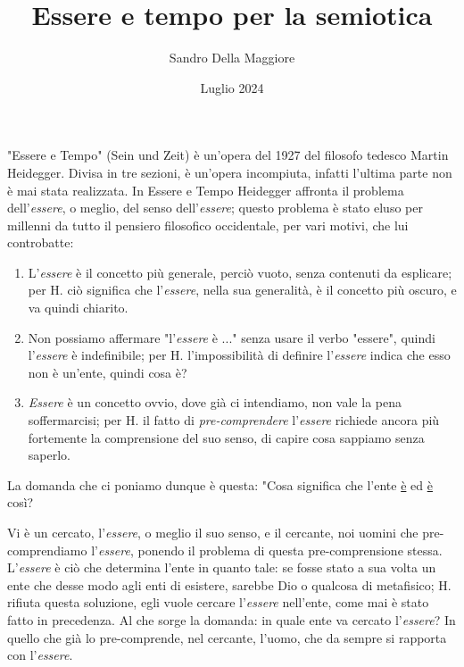 \documentclass[a4paper,12pt,oneside]{article}%
\begin{document}
	\author{Sandro Della Maggiore}
	\title{Essere e tempo per la semiotica}
	\date{Luglio 2024}
	
	\maketitle


"Essere e Tempo" (Sein und Zeit) è un’opera del 1927 del filosofo tedesco Martin Heidegger. Divisa in tre sezioni, è un’opera incompiuta, infatti l’ultima parte non è mai stata realizzata. In Essere e Tempo Heidegger affronta il problema dell’\textit{essere}, o meglio, del senso dell'\textit{essere}; questo problema è stato eluso per millenni da tutto il pensiero filosofico occidentale, per vari motivi, che lui controbatte:

\begin{enumerate}
	\item L'\textit{essere} è il concetto più generale, perciò vuoto, senza contenuti da esplicare; per H. ciò significa che l'\textit{essere}, nella sua generalità, è il concetto più oscuro, e va quindi chiarito.
	\item Non possiamo affermare "l'\textit{essere} è ..." senza usare il verbo "essere", quindi l'\textit{essere} è indefinibile; per H. l'impossibilità di definire l'\textit{essere} indica che esso non è un'ente, quindi cosa è?
	\item \textit{Essere} è un concetto ovvio, dove già ci intendiamo, non vale la pena soffermarcisi; per H. il fatto di \textit{pre-comprendere} l'\textit{essere} richiede ancora più fortemente la comprensione del suo senso, di capire cosa sappiamo senza saperlo.
\end{enumerate}

La domanda che ci poniamo dunque è questa: "Cosa significa che l'ente \underline{è} ed \underline{è} così?

Vi è un cercato, l'\textit{essere}, o meglio il suo senso, e il cercante, noi uomini che pre-comprendiamo l'\textit{essere}, ponendo il problema di questa pre-comprensione stessa. L'\textit{essere} è ciò che determina l'ente in quanto tale: se fosse stato a sua volta un ente che desse modo agli enti di esistere, sarebbe Dio o qualcosa di metafisico; H. rifiuta questa soluzione, egli vuole cercare l'\textit{essere} nell'ente, come mai è stato fatto in precedenza. Al che sorge la domanda: in quale ente va cercato l'\textit{essere}? In quello che già lo pre-comprende, nel cercante, l'uomo, che da sempre si rapporta con l'\textit{essere}.
\end{document}
